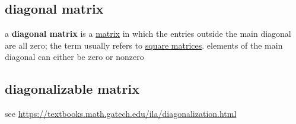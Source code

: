 \documentclass[a4paper,12pt]{article}
\begin{document}
\subsection{diagonal matrix}
\label{sec:orgaf43c3e}
\begin{definition}
a \textbf{diagonal matrix} is a \hyperref[sec:org2833a15]{matrix} in which the entries outside the main diagonal are all zero; the term usually refers to \hyperref[sec:orgf670bc9]{square matrices}. elements of the main diagonal can either be zero or nonzero\\
\end{definition}
\subsection{diagonalizable matrix}
\label{sec:org136aa39}
see \url{https://textbooks.math.gatech.edu/ila/diagonalization.html}\\
\end{document}
